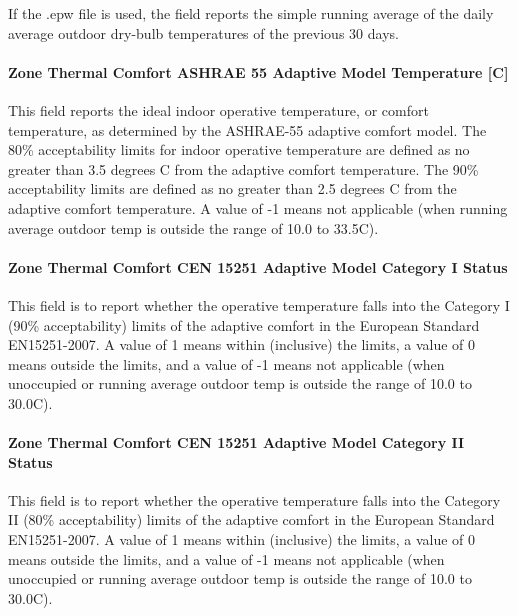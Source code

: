 If the .epw file is used, the field reports the simple running average of the daily average outdoor dry-bulb temperatures of the previous 30 days.

\paragraph{Zone Thermal Comfort ASHRAE 55 Adaptive Model Temperature {[}C{]}}\label{zone-thermal-comfort-ashrae-55-adaptive-model-temperature-c}

This field reports the ideal indoor operative temperature, or comfort temperature, as determined by the ASHRAE-55 adaptive comfort model. The 80\% acceptability limits for indoor operative temperature are defined as no greater than 3.5 degrees C from the adaptive comfort temperature. The 90\% acceptability limits are defined as no greater than 2.5 degrees C from the adaptive comfort temperature. A value of -1 means not applicable (when running average outdoor temp is outside the range of 10.0 to 33.5C).

\paragraph{Zone Thermal Comfort CEN 15251 Adaptive Model Category I Status}\label{zone-thermal-comfort-cen-15251-adaptive-model-category-i-status}

This field is to report whether the operative temperature falls into the Category I (90\% acceptability) limits of the adaptive comfort in the European Standard EN15251-2007. A value of 1 means within (inclusive) the limits, a value of 0 means outside the limits, and a value of -1 means not applicable (when unoccupied or running average outdoor temp is outside the range of 10.0 to 30.0C).

\paragraph{Zone Thermal Comfort CEN 15251 Adaptive Model Category II Status}\label{zone-thermal-comfort-cen-15251-adaptive-model-category-ii-status}

This field is to report whether the operative temperature falls into the Category II (80\% acceptability) limits of the adaptive comfort in the European Standard EN15251-2007. A value of 1 means within (inclusive) the limits, a value of 0 means outside the limits, and a value of -1 means not applicable (when unoccupied or running average outdoor temp is outside the range of 10.0 to 30.0C).

